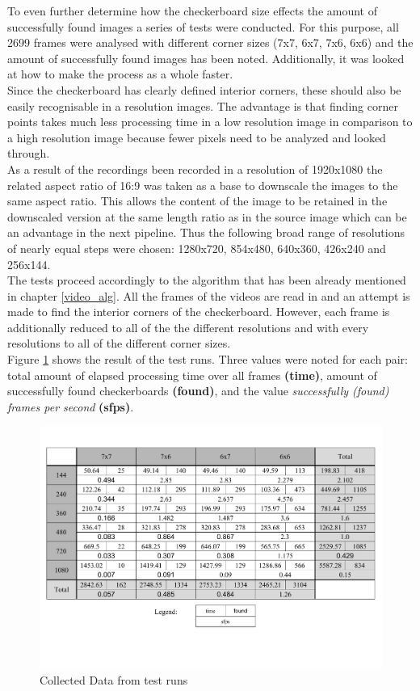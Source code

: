 To even further determine how the checkerboard size effects the amount of successfully found images a series of tests were conducted. For this purpose, all 2699 frames were analysed with different corner sizes (7x7, 6x7, 7x6, 6x6) and the amount of successfully found images has been noted. Additionally, it was looked at how to make the process as a whole faster.\\

Since the checkerboard has clearly defined interior corners, these should also be easily recognisable in a resolution images. The advantage is that finding corner points takes much less processing time in a low resolution image in comparison to a high resolution image because fewer pixels need to be analyzed and looked through.\\

As a result of the recordings been recorded in a resolution of 1920x1080 the related aspect ratio of 16:9 was taken as a base to downscale the images to the same aspect ratio. This allows the content of the image to be retained in the downscaled version at the same length ratio as in the source image which can be an advantage in the next pipeline. Thus the following broad range of resolutions of nearly equal steps were chosen: 1280x720, 854x480, 640x360, 426x240 and 256x144.\\

The tests proceed accordingly to the algorithm that has been already mentioned in chapter \ref{video_alg}. All the frames of the videos are read in and an attempt is made to find the interior corners of the checkerboard. However, each frame is additionally reduced to all of the the different resolutions and with every resolutions to all of the different corner sizes.\\

Figure \ref{fig:exp_data} shows the result of the test runs. Three values were noted for each pair: total amount of elapsed processing time over all frames \textbf{(time)}, amount of successfully found checkerboards \textbf{(found)}, and the value \textit{successfully (found) frames per second} \textbf{(sfps)}.

\begin{figure}[H]
    \centering
    \includegraphics[width=.9\textwidth]{image/2/experiment_data.pdf}
    \caption{Collected Data from test runs}
    \label{fig:exp_data}
\end{figure}

